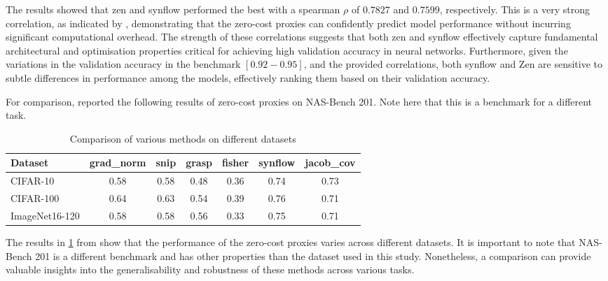 The results showed that zen and \gls{synflow} performed the best with a spearman $\rho$ of $0.7827$ and $0.7599$, respectively. This is a very strong correlation, as indicated by \cite{spear}, demonstrating that the zero-cost proxies can confidently predict model performance without incurring significant computational overhead. The strength of these correlations suggests that both zen and \gls{synflow} effectively capture fundamental architectural and optimisation properties critical for achieving high validation accuracy in neural networks. Furthermore, given the variations in the validation accuracy in the benchmark $[0.92 - 0.95]$, and the provided correlations, both \gls{synflow} and Zen are sensitive to subtle differences in performance among the models, effectively ranking them based on their validation accuracy. 

For comparison, \cite{abdelfattah2021zero} reported the following results of zero-cost proxies on NAS-Bench 201. Note here that this is a benchmark for a different task. 

\begin{table}[h]
\caption{Comparison of various methods on different datasets}
\centering
\begin{adjustbox}{center}
\begin{tabular}{l|cccccc}
\textbf{Dataset} & \textbf{grad\_norm} & \textbf{snip} & \textbf{grasp} & \textbf{fisher} & \textbf{synflow} & \textbf{jacob\_cov} \\ \hline
\multicolumn{1}{l|}{CIFAR-10} & 0.58 & 0.58 & 0.48 & 0.36 & 0.74 & 0.73 \\
\multicolumn{1}{l|}{\cellcolor{verylightgray}CIFAR-100} & \cellcolor{verylightgray}0.64 & \cellcolor{verylightgray}0.63 & \cellcolor{verylightgray}0.54 & \cellcolor{verylightgray}0.39 & \cellcolor{verylightgray}0.76 & \cellcolor{verylightgray}0.71 \\
\multicolumn{1}{l|}{ImageNet16-120} & 0.58 & 0.58 & 0.56 & 0.33 & 0.75 & 0.71 \\
\end{tabular}
\end{adjustbox}
\label{tab:comparison}
\end{table}

The results in \cref{tab:comparison} from \cite{abdelfattah2021zero} show that the performance of the zero-cost proxies varies across different datasets. It is important to note that \gls{NAS}-Bench 201 is a different benchmark and has other properties than the dataset used in this study. Nonetheless, a comparison can provide valuable insights into the generalisability and robustness of these methods across various tasks.

